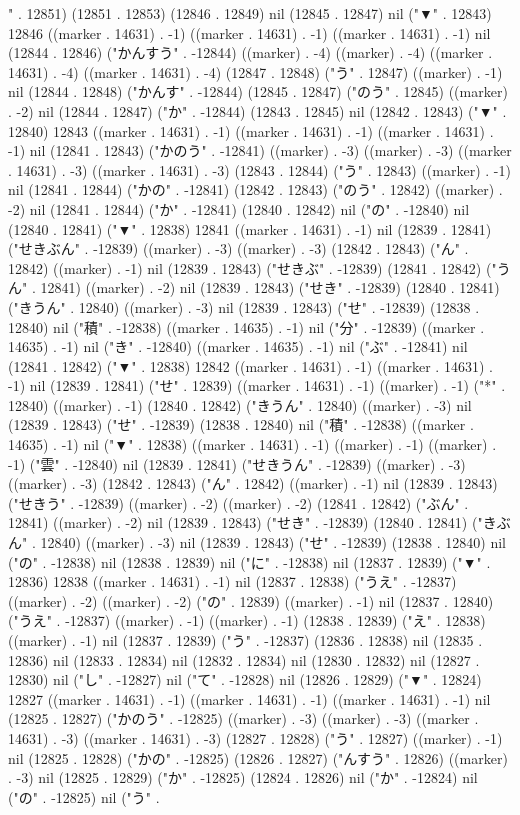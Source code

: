 " . 12851) (12851 . 12853) (12846 . 12849) nil (12845 . 12847) nil ("▼" . 12843) 12846 ((marker . 14631) . -1) ((marker . 14631) . -1) ((marker . 14631) . -1) nil (12844 . 12846) ("かんすう" . -12844) ((marker) . -4) ((marker) . -4) ((marker . 14631) . -4) ((marker . 14631) . -4) (12847 . 12848) ("う" . 12847) ((marker) . -1) nil (12844 . 12848) ("かんす" . -12844) (12845 . 12847) ("のう" . 12845) ((marker) . -2) nil (12844 . 12847) ("か" . -12844) (12843 . 12845) nil (12842 . 12843) ("▼" . 12840) 12843 ((marker . 14631) . -1) ((marker . 14631) . -1) ((marker . 14631) . -1) nil (12841 . 12843) ("かのう" . -12841) ((marker) . -3) ((marker) . -3) ((marker . 14631) . -3) ((marker . 14631) . -3) (12843 . 12844) ("う" . 12843) ((marker) . -1) nil (12841 . 12844) ("かの" . -12841) (12842 . 12843) ("のう" . 12842) ((marker) . -2) nil (12841 . 12844) ("か" . -12841) (12840 . 12842) nil ("の" . -12840) nil (12840 . 12841) ("▼" . 12838) 12841 ((marker . 14631) . -1) nil (12839 . 12841) ("せきぶん" . -12839) ((marker) . -3) ((marker) . -3) (12842 . 12843) ("ん" . 12842) ((marker) . -1) nil (12839 . 12843) ("せきぶ" . -12839) (12841 . 12842) ("うん" . 12841) ((marker) . -2) nil (12839 . 12843) ("せき" . -12839) (12840 . 12841) ("きうん" . 12840) ((marker) . -3) nil (12839 . 12843) ("せ" . -12839) (12838 . 12840) nil ("積" . -12838) ((marker . 14635) . -1) nil ("分" . -12839) ((marker . 14635) . -1) nil ("き" . -12840) ((marker . 14635) . -1) nil ("ぶ" . -12841) nil (12841 . 12842) ("▼" . 12838) 12842 ((marker . 14631) . -1) ((marker . 14631) . -1) nil (12839 . 12841) ("せ" . 12839) ((marker . 14631) . -1) ((marker) . -1) ("*" . 12840) ((marker) . -1) (12840 . 12842) ("きうん" . 12840) ((marker) . -3) nil (12839 . 12843) ("せ" . -12839) (12838 . 12840) nil ("積" . -12838) ((marker . 14635) . -1) nil ("▼" . 12838) ((marker . 14631) . -1) ((marker) . -1) ((marker) . -1) ("雲" . -12840) nil (12839 . 12841) ("せきうん" . -12839) ((marker) . -3) ((marker) . -3) (12842 . 12843) ("ん" . 12842) ((marker) . -1) nil (12839 . 12843) ("せきう" . -12839) ((marker) . -2) ((marker) . -2) (12841 . 12842) ("ぶん" . 12841) ((marker) . -2) nil (12839 . 12843) ("せき" . -12839) (12840 . 12841) ("きぶん" . 12840) ((marker) . -3) nil (12839 . 12843) ("せ" . -12839) (12838 . 12840) nil ("の" . -12838) nil (12838 . 12839) nil ("に" . -12838) nil (12837 . 12839) ("▼" . 12836) 12838 ((marker . 14631) . -1) nil (12837 . 12838) ("うえ" . -12837) ((marker) . -2) ((marker) . -2) ("の" . 12839) ((marker) . -1) nil (12837 . 12840) ("うえ" . -12837) ((marker) . -1) ((marker) . -1) (12838 . 12839) ("え" . 12838) ((marker) . -1) nil (12837 . 12839) ("う" . -12837) (12836 . 12838) nil (12835 . 12836) nil (12833 . 12834) nil (12832 . 12834) nil (12830 . 12832) nil (12827 . 12830) nil ("し" . -12827) nil ("て" . -12828) nil (12826 . 12829) ("▼" . 12824) 12827 ((marker . 14631) . -1) ((marker . 14631) . -1) ((marker . 14631) . -1) nil (12825 . 12827) ("かのう" . -12825) ((marker) . -3) ((marker) . -3) ((marker . 14631) . -3) ((marker . 14631) . -3) (12827 . 12828) ("う" . 12827) ((marker) . -1) nil (12825 . 12828) ("かの" . -12825) (12826 . 12827) ("んすう" . 12826) ((marker) . -3) nil (12825 . 12829) ("か" . -12825) (12824 . 12826) nil ("か" . -12824) nil ("の" . -12825) nil ("う" . 